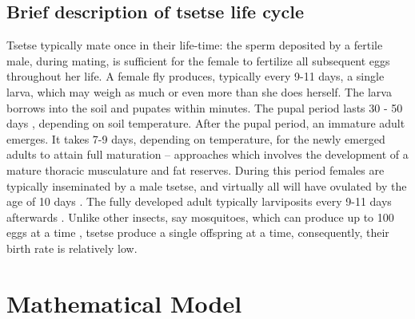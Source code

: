 \documentclass[smallextended]{svjour3}
\begin{document}
\subsection{Brief description of tsetse life cycle}

Tsetse typically mate once in their life-time: the sperm deposited by a fertile male, during mating, is sufficient for the female to fertilize all subsequent eggs throughout her life. A female fly produces, typically every 9-11 days, a single larva, which may weigh as much or even more than she does herself.  The larva borrows into the soil and pupates within minutes. The pupal period lasts 30 - 50 days \cite{PhelpsR.J.&Burrows}, depending on soil temperature. After the pupal period, an immature adult emerges. It takes 7-9 days, depending on temperature, for the newly emerged adults to attain full maturation – approaches which involves the development of a mature thoracic musculature and fat reserves. During this period females are typically inseminated by a male tsetse, and virtually all will have ovulated by the age of 10 days \cite{Hargrove2012c}. The fully developed adult typically larviposits every 9-11 days afterwards \cite{Hargrove2019}. Unlike other insects, say mosquitoes, which can produce up to 100 eggs at a time \cite{Clemons2010}, tsetse produce a single offspring at a time, consequently, their birth rate is relatively low. 




\section{Mathematical Model}
\end{document}

